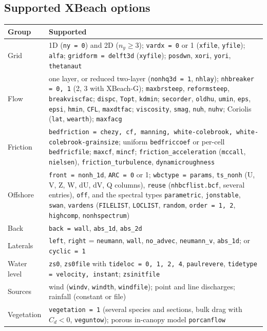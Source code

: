 \documentclass[11pt,a4paper]{article}
\newcommand{\code}[1]{\texttt{#1}}
\begin{document}
\subsection{Supported XBeach options}
\begin{center}\small
\begin{tabularx}{\textwidth}{lX}
\toprule
Group & Supported \\
\midrule
Grid & 1D (\code{ny = 0}) and 2D ($n_y \geq 3$); \code{vardx = 0} or 1 (\code{xfile}, \code{yfile}); \code{alfa}; \code{gridform = delft3d} (\code{xyfile}); \code{posdwn}, \code{xori}, \code{yori}, \code{thetanaut} \\
Flow & one layer, or reduced two-layer (\code{nonhq3d = 1}, \code{nhlay}); \code{nhbreaker = 0, 1} (2, 3 with XBeach-G); \code{maxbrsteep}, \code{reformsteep}, \code{breakviscfac}; \code{dispc}, \code{Topt}, \code{kdmin}; \code{secorder}, \code{oldhu}, \code{umin}, \code{eps}, \code{epsi}, \code{hmin}, \code{CFL}, \code{maxdtfac}; \code{viscosity}, \code{smag}, \code{nuh}, \code{nuhv}; Coriolis (\code{lat}, \code{wearth}); \code{maxfacg} \\
Friction & \code{bedfriction = chezy, cf, manning, white-colebrook, white-colebrook-grainsize}; uniform \code{bedfriccoef} or per-cell \code{bedfricfile}; \code{maxcf}, \code{mincf}; \code{friction\_acceleration} (\code{mccall}, \code{nielsen}), \code{friction\_turbulence}, \code{dynamicroughness} \\
Offshore & \code{front = nonh\_1d}, \code{ARC = 0} or 1; \code{wbctype = params}, \code{ts\_nonh} (U, V, Z, W, dU, dV, Q columns), \code{reuse} (\code{nhbcflist.bcf}, several entries), \code{off}, and the spectral types \code{parametric}, \code{jonstable}, \code{swan}, \code{vardens} (\code{FILELIST}, \code{LOCLIST}, \code{random}, \code{order = 1, 2}, \code{highcomp}, \code{nonhspectrum}) \\
Back & \code{back = wall}, \code{abs\_1d}, \code{abs\_2d} \\
Laterals & \code{left}, \code{right} = \code{neumann}, \code{wall}, \code{no\_advec}, \code{neumann\_v}, \code{abs\_1d}; or \code{cyclic = 1} \\
Water level & \code{zs0}, \code{zs0file} with \code{tideloc = 0, 1, 2, 4}, \code{paulrevere}, \code{tidetype = velocity, instant}; \code{zsinitfile} \\
Sources & wind (\code{windv}, \code{windth}, \code{windfile}); point and line discharges; rainfall (constant or file) \\
Vegetation & \code{vegetation = 1} (several species and sections, bulk drag with $C_d < 0$, \code{veguntow}); porous in-canopy model \code{porcanflow} \\

\end{tabularx}
\end{center}
\end{document}
